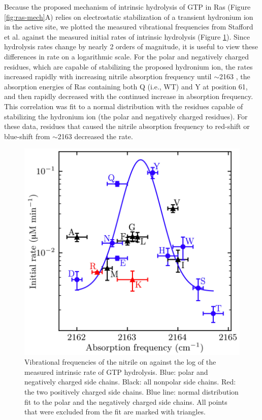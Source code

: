 Because the proposed mechanism of intrinsic hydrolysis of GTP in Ras (Figure \ref{fig:ras-mech}A) relies on electrostatic stabilization of a transient hydronium ion in the active site, we plotted the measured vibrational frequencies from Stafford et al.\cite{Stafford2012} against the measured initial rates of intrinsic hydrolysis (Figure \ref{fig:ras-stark_vs_rate}). 
Since hydrolysis rates change by nearly 2 orders of magnitude, it is useful to view these differences in rate on a logarithmic scale. 
For the polar and negatively charged residues, which are capable of stabilizing the proposed hydronium ion, the rates increased rapidly with increasing nitrile absorption frequency until $\sim$2163 \si{\wn}, the absorption energies of Ras containing both Q (i.e., WT) and Y at position 61, and then rapidly decreased with the continued increase in absorption frequency. 
This correlation was fit to a normal distribution with the residues capable of stabilizing the hydronium ion (the polar and negatively charged residues). 
For these data, residues that caused the nitrile absorption frequency to red-shift or blue-shift from $\sim$2163 \si{\wn} decreased the rate.

\begin{figure}
    \center
    \includegraphics[width=\single]{figures-ras/Figure4.png}
    \caption{
        Vibrational frequencies of the nitrile on \RalBSCN{} against the log of the measured intrinsic rate of GTP hydrolysis. 
        Blue: polar and negatively charged side chains. Black: all nonpolar side chains. 
        Red: the two positively charged side chains. Blue line: normal distribution fit to the polar and the negatively charged side chains. 
        All points that were excluded from the fit are marked with triangles.
    }
    \label{fig:ras-stark_vs_rate}
\end{figure}


